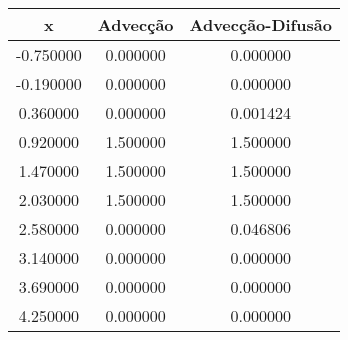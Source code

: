 \begin{tabular}{ccc}
\toprule
x & Advecção & Advecção-Difusão \\
\midrule
-0.750000 & 0.000000 & 0.000000 \\
-0.190000 & 0.000000 & 0.000000 \\
0.360000 & 0.000000 & 0.001424 \\
0.920000 & 1.500000 & 1.500000 \\
1.470000 & 1.500000 & 1.500000 \\
2.030000 & 1.500000 & 1.500000 \\
2.580000 & 0.000000 & 0.046806 \\
3.140000 & 0.000000 & 0.000000 \\
3.690000 & 0.000000 & 0.000000 \\
4.250000 & 0.000000 & 0.000000 \\
\bottomrule
\end{tabular}
